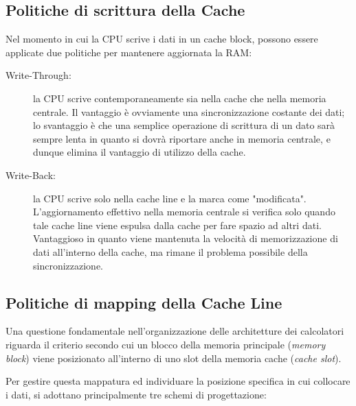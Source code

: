 \documentclass[12pt]{report}
\begin{document}
	\subsection{Politiche di scrittura della Cache}
	Nel momento in cui la CPU scrive i dati in un cache block, possono essere applicate due politiche per mantenere aggiornata la RAM:
	\begin{description}
		\item [Write-Through:] la CPU scrive contemporaneamente sia nella cache che nella memoria centrale. Il vantaggio è ovviamente una sincronizzazione costante dei dati; lo svantaggio è che una semplice operazione di scrittura di un dato sarà sempre lenta in quanto si dovrà riportare anche in memoria centrale, e dunque elimina il vantaggio di utilizzo della cache.
		
		\item [Write-Back:] la CPU scrive solo nella cache line e la marca come "modificata". L'aggiornamento effettivo nella memoria centrale si verifica solo quando tale cache line viene espulsa dalla cache per fare spazio ad altri dati. Vantaggioso in quanto viene mantenuta la velocità di memorizzazione di dati all'interno della cache, ma rimane il problema possibile della sincronizzazione.
	\end{description}
	
	\subsection{Politiche di mapping della Cache Line}
	
	Una questione fondamentale nell'organizzazione delle architetture dei calcolatori riguarda il criterio secondo cui un blocco della memoria principale (\textit{memory block}) viene posizionato all'interno di uno slot della memoria cache (\textit{cache slot}). 
	
	Per gestire questa mappatura ed individuare la posizione specifica in cui collocare i dati, si adottano principalmente tre schemi di progettazione:
	
\end{document}
